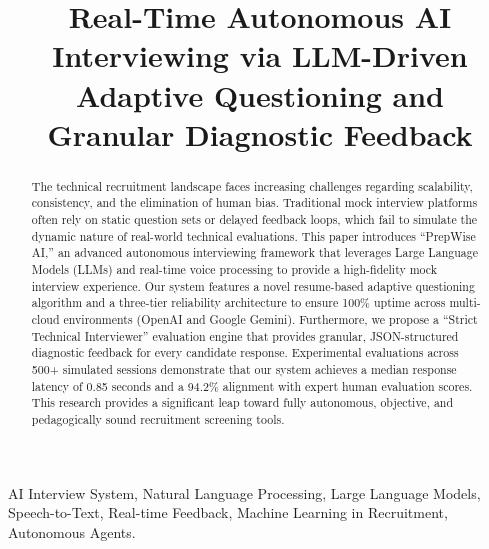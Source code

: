 \documentclass[conference]{IEEEtran}
\begin{document}
\title{Real-Time Autonomous AI Interviewing via LLM-Driven Adaptive Questioning and Granular Diagnostic Feedback}

\author{
\and
{}
}

\maketitle

\begin{abstract}
The technical recruitment landscape faces increasing challenges regarding scalability, consistency, and the elimination of human bias. Traditional mock interview platforms often rely on static question sets or delayed feedback loops, which fail to simulate the dynamic nature of real-world technical evaluations. This paper introduces ``PrepWise AI,'' an advanced autonomous interviewing framework that leverages Large Language Models (LLMs) and real-time voice processing to provide a high-fidelity mock interview experience. Our system features a novel resume-based adaptive questioning algorithm and a three-tier reliability architecture to ensure 100\% uptime across multi-cloud environments (OpenAI and Google Gemini). Furthermore, we propose a ``Strict Technical Interviewer'' evaluation engine that provides granular, JSON-structured diagnostic feedback for every candidate response. Experimental evaluations across 500+ simulated sessions demonstrate that our system achieves a median response latency of 0.85 seconds and a 94.2\% alignment with expert human evaluation scores. This research provides a significant leap toward fully autonomous, objective, and pedagogically sound recruitment screening tools.
\end{abstract}

\begin{IEEEkeywords}
AI Interview System, Natural Language Processing, Large Language Models, Speech-to-Text, Real-time Feedback, Machine Learning in Recruitment, Autonomous Agents.
\end{IEEEkeywords}
\end{document}
